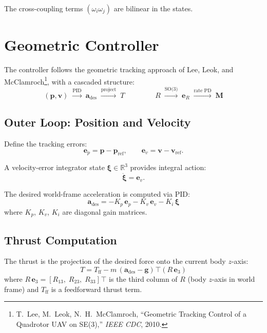 \documentclass[11pt]{article}
\newcommand{\R}{\mathbb{R}}
\newcommand{\der}[1]{\dot{#1}}
\newcommand{\T}{\!\top}
\begin{document}
The cross-coupling terms $(\omega_i \omega_j)$ are bilinear in the
states.

\section{Geometric Controller}

The controller follows the geometric tracking approach of Lee, Leok, and
McClamroch\footnote{T.~Lee, M.~Leok, N.~H.~McClamroch, ``Geometric
Tracking Control of a Quadrotor UAV on SE(3),'' \emph{IEEE CDC}, 2010.},
with a cascaded structure:
\[
  (\bm{p},\bm{v}) \;\xrightarrow{\text{PID}}\;
  \bm{a}_\mathrm{des} \;\xrightarrow{\text{project}}\;
  T \;\qquad\qquad
  R \;\xrightarrow{\text{SO(3)}}\;
  \bm{e}_R \;\xrightarrow{\text{rate PD}}\;
  \bm{M}
\]

\subsection{Outer Loop: Position and Velocity}

Define the tracking errors:
\begin{equation}
  \bm{e}_p = \bm{p} - \bm{p}_\mathrm{ref}, \qquad
  \bm{e}_v = \bm{v} - \bm{v}_\mathrm{ref}.
\end{equation}

A velocity-error integrator state $\bm{\xi} \in \R^3$ provides integral
action:
\begin{equation}
  \der{\bm{\xi}} = \bm{e}_v.
\end{equation}

The desired world-frame acceleration is computed via PID:
\begin{equation}
  \bm{a}_\mathrm{des} =
    -K_p\,\bm{e}_p - K_v\,\bm{e}_v - K_i\,\bm{\xi}
\end{equation}
where $K_p$, $K_v$, $K_i$ are diagonal gain matrices.

\subsection{Thrust Computation}

The thrust is the projection of the desired force onto the current body
$z$-axis:
\begin{equation}
  T = T_\mathrm{ff}
      - m\,(\bm{a}_\mathrm{des} - \bm{g})^\T (R\,\bm{e}_3)
\end{equation}
where $R\,\bm{e}_3 = [R_{13},\; R_{23},\; R_{33}]^\T$ is the third
column of $R$ (body $z$-axis in world frame) and $T_\mathrm{ff}$ is a
feedforward thrust term.
\end{document}
